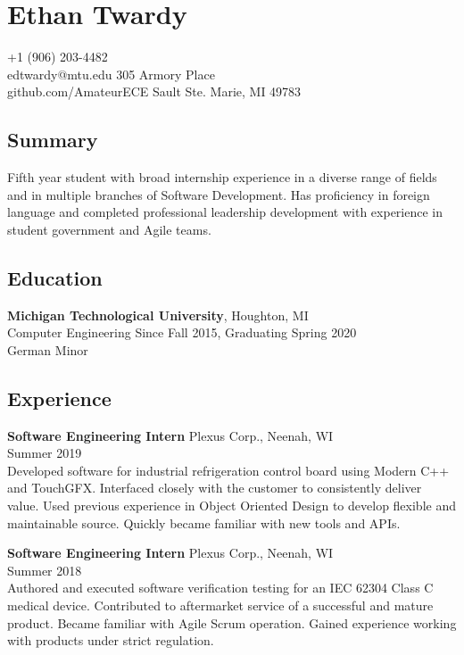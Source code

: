 \documentclass[11pt]{article}
\begin{document}
\section*{Ethan Twardy}
+1 (906) 203-4482\\
edtwardy@mtu.edu
\hfill
305 Armory Place\\
github.com/AmateurECE
\hfill
Sault Ste. Marie, MI 49783

\hrulefill

{
  \titlespacing{\subsection}{0pt}{0pt}{0pt}
  \subsection*{Summary}
  Fifth year student with broad internship experience in a diverse range of
  fields and in multiple branches of Software Development. Has proficiency in
  foreign language and completed professional leadership development with
  experience in student government and Agile teams.
}

\subsection*{Education}
\textbf{Michigan Technological University}, Houghton, MI\\
Computer Engineering
\hfill
Since Fall 2015, Graduating Spring 2020\\
German Minor

\subsection*{Experience}
\textbf{Software Engineering Intern}
\hfill
Plexus Corp., Neenah, WI\\
Summer 2019\\
Developed software for industrial refrigeration control board using Modern C++
and TouchGFX. Interfaced closely with the customer to consistently deliver
value. Used previous experience in Object Oriented Design to develop flexible
and maintainable source. Quickly became familiar with new tools and APIs.

\vspace{12pt}
\textbf{Software Engineering Intern}
\hfill
Plexus Corp., Neenah, WI\\
Summer 2018\\
Authored and executed software verification testing for an IEC 62304 Class C
medical device. Contributed to aftermarket service of a successful and mature
product. Became familiar with Agile Scrum operation. Gained experience working
with products under strict regulation.
\end{document}
